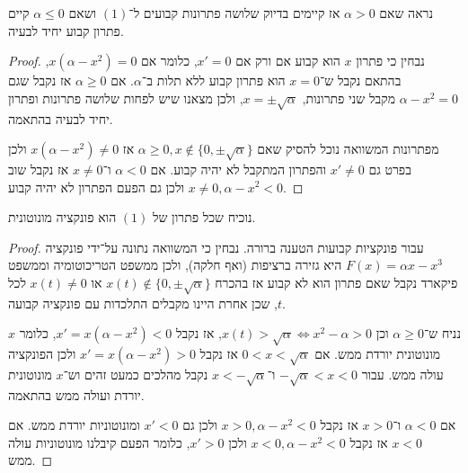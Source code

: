 \subquestion{}
נראה שאם $\alpha > 0$ אז קיימים בדיוק שלושה פתרונות קבועים ל־$(1)$ ושאם $\alpha \le 0$ קיים פתרון קבוע יחיד לבעיה.
\begin{proof}
	נבחין כי פתרון $x$ הוא קבוע אם ורק אם $x' = 0$, כלומר אם $x (\alpha - x^2) = 0$, בהתאם נקבל ש־$x = 0$ הוא פתרון קבוע ללא תלות ב־$\alpha$.
	אם $\alpha \ge 0$ אז נקבל שגם $\alpha - x^2 = 0$ מקבל שני פתרונות, $x = \pm \sqrt{\alpha}$, ולכן מצאנו שיש לפחות שלושה פתרונות ופתרון יחיד לבעיה בהתאמה.

	מפתרונות המשוואה נוכל להסיק שאם $\alpha \ge 0, x \notin \{0, \pm \sqrt{\alpha} \}$ אז $x (\alpha - x^2) \ne 0$ ולכן בפרט גם $x' \ne 0$ והפתרון המתקבל לא יהיה קבוע.
	אם $\alpha < 0$ ו־$x \ne 0$ אז נקבל שוב $x \ne 0, \alpha - x^2 < 0$ ולכן גם הפעם הפתרון לא יהיה קבוע.
\end{proof}

\subquestion{}
נוכיח שכל פתרון של $(1)$ הוא פונקציה מונוטונית.
\begin{proof}
	עבור פונקציות קבועות הטענה ברורה.
	נבחין כי המשוואה נתונה על־ידי פונקציה $F(x) = \alpha x - x^3$ היא גזירה ברציפות (ואף חלקה),
	ולכן ממשפט הטריכוטומיה וממשפט פיקארד נקבל שאם פתרון הוא לא קבוע אז בהכרח $x(t) \notin \{ 0, \pm \sqrt{\alpha} \}$ או $x(t) \ne 0$ לכל $t$, שכן אחרת היינו מקבלים התלכדות עם פונקציה קבועה.

	נניח ש־$\alpha \ge 0$ וכן $x(t) > \sqrt{\alpha} \iff x^2 - \alpha > 0$, אז נקבל $x' = x (\alpha - x^2) < 0$, כלומר $x$ מונוטונית יורדת ממש.
	אם $0 < x < \sqrt{\alpha}$ אז נקבל $x' = x (\alpha - x^2) > 0$ ולכן הפונקציה עולה ממש.
	עבור $-\sqrt{\alpha} < x < 0$ ו־$x < -\sqrt{\alpha}$ נקבל מהלכים כמעט זהים וש־$x$ מונוטונית יורדת ועולה ממש בהתאמה.

	אם $\alpha < 0$ ו־$x > 0$ אז נקבל $x > 0, \alpha - x^2 < 0$ ולכן גם $x' < 0$ ומונוטוניות יורדת ממש.
	אם $x < 0$ אז נקבל $x < 0, \alpha - x^2 < 0$ ולכן $x' > 0$, כלומר הפעם קיבלנו מונוטוניות עולה ממש.
\end{proof}

